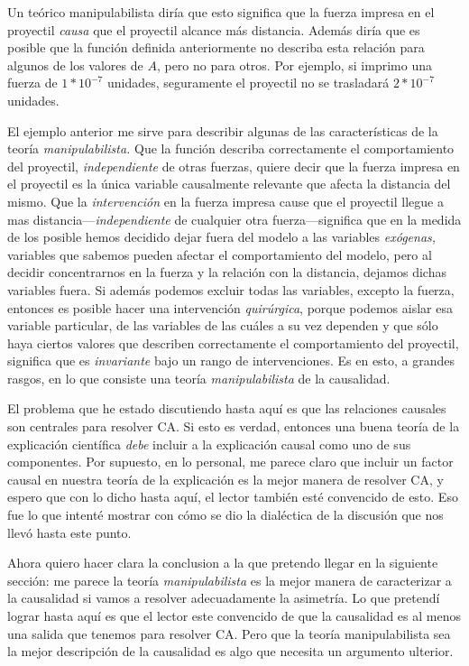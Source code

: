 Un teórico manipulabilista diría que esto significa que la
fuerza impresa en el proyectil \emph{causa} que el proyectil
alcance más distancia. Además diría que es posible que la
función definida anteriormente no describa esta relación
para algunos de los valores de $ A $, pero no para otros.
Por ejemplo, si imprimo una fuerza de $ 1*10^{-7} $
unidades, seguramente el proyectil no se trasladará $
2*10^{-7} $ unidades.

El ejemplo anterior me sirve para describir algunas de las
características de la teoría \emph{manipulabilista.} Que la
función describa correctamente el comportamiento del
proyectil, \emph{independiente} de otras fuerzas, quiere
decir que la fuerza impresa en el proyectil es la única
variable causalmente relevante que afecta la distancia del
mismo. Que la \emph{intervención} en la fuerza impresa
cause que el proyectil llegue a mas
distancia---\emph{independiente} de cualquier otra
fuerza---significa que en la medida de los posible hemos
decidido dejar fuera del modelo a las variables
\emph{exógenas,} variables que sabemos pueden afectar el
comportamiento del modelo, pero al decidir concentrarnos en
la fuerza y la relación con la distancia, dejamos dichas
variables fuera. Si además podemos excluir todas las
variables, excepto la fuerza, entonces es posible hacer una
intervención \emph{quirúrgica}, porque podemos aislar esa
variable particular, de las variables de las cuáles a su vez
dependen y que sólo haya ciertos valores que describen
correctamente el comportamiento del proyectil, significa que
es \emph{invariante} bajo un rango de intervenciones. Es en
esto, a grandes rasgos, en lo que consiste una teoría
\emph{manipulabilista} de la causalidad.

El problema que he estado discutiendo hasta aquí es que las
relaciones causales son centrales para resolver CA. Si esto
es verdad, entonces una buena teoría de la explicación
científica \emph{debe} incluir a la explicación causal como
uno de sus componentes. Por supuesto, en lo personal, me
parece claro que incluir un factor causal en nuestra teoría
de la explicación es la mejor manera de resolver CA, y
espero que con lo dicho hasta aquí, el lector
también esté convencido de esto. Eso fue lo que
intenté mostrar con cómo se dio la dialéctica de la discusión
que nos llevó hasta este punto.

Ahora quiero hacer clara la conclusion a la que pretendo
llegar en la siguiente sección: me parece la teoría
\emph{manipulabilista} es la mejor manera de caracterizar a
la causalidad si vamos a resolver adecuadamente la
asimetría. Lo que pretendí lograr hasta aquí es que el
lector este convencido de que la causalidad es al menos una
salida que tenemos para resolver CA. Pero que la teoría
manipulabilista sea la mejor descripción de la causalidad es
algo que necesita un argumento ulterior. 

